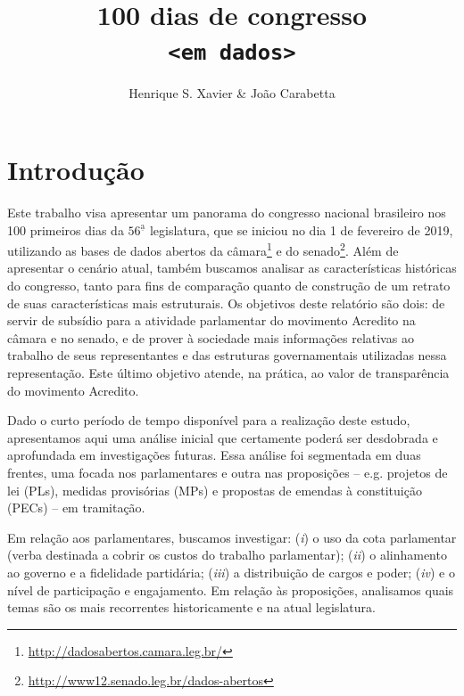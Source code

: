 \documentclass[12pt,a4paper]{article}
\author{Henrique S. Xavier \& João Carabetta}
\title{\secColor\Huge\sffamily\bfseries 100 dias de congresso\\\texttt{<em dados>}}
\affil{Gabinete compartilhado\\Movimento Acredito no Congresso Nacional}
\newcommand{\footurl}[1]{{\scriptsize\url{#1}}}
\begin{document}
\thispagestyle{empty}
\maketitle
\pagebreak

\thispagestyle{empty}
\tableofcontents
\pagebreak

\thispagestyle{plain}

\section{Introdução}
\label{sec:intro}

Este trabalho visa apresentar um panorama do congresso nacional brasileiro nos 100 primeiros dias da $56^{\mathrm{\underline{a}}}$ legislatura, que
se iniciou no dia 1 de fevereiro de 2019, utilizando as bases de dados abertos da câmara\footnote{\footurl{http://dadosabertos.camara.leg.br/}}
e do senado\footnote{\footurl{http://www12.senado.leg.br/dados-abertos}}. Além de apresentar o cenário atual, também buscamos analisar
as características históricas do congresso, tanto para fins de comparação quanto de construção de um retrato de suas características
mais estruturais. Os objetivos deste relatório são dois: de servir de subsídio para a atividade parlamentar do movimento Acredito na
câmara e no senado, e de prover à sociedade mais informações relativas ao trabalho de seus representantes e das estruturas governamentais
utilizadas nessa representação. Este último objetivo atende, na prática, ao valor de transparência do movimento Acredito.

Dado o curto período de tempo disponível para a realização deste estudo, apresentamos aqui uma análise inicial que
certamente poderá ser desdobrada e aprofundada em investigações futuras. Essa análise foi segmentada em duas frentes,
uma focada nos parlamentares e outra nas proposições -- e.g. projetos de lei (PLs), medidas provisórias (MPs) e propostas
de emendas à constituição (PECs) -- em tramitação.

Em relação aos parlamentares, buscamos investigar:
(\emph{i}) o uso da cota parlamentar (verba destinada a cobrir os custos do trabalho parlamentar);
(\emph{ii}) o alinhamento ao governo e a fidelidade partidária;
(\emph{iii}) a distribuição de cargos e poder;
(\emph{iv}) e o nível de participação e engajamento.
Em relação às proposições, analisamos quais temas são os mais recorrentes historicamente e na atual legislatura.
\end{document}
